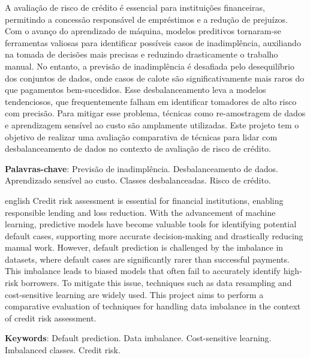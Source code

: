 
\setlength{\absparsep}{18pt} %
\begin{resumo}
  A avaliação de risco de crédito é essencial para instituições financeiras,
  permitindo a concessão responsável de empréstimos e a redução de
  prejuízos. Com
  o avanço do aprendizado de máquina, modelos preditivos tornaram-se
  ferramentas valiosas para identificar possíveis casos de
  inadimplência, auxiliando
  na tomada de decisões mais precisas e reduzindo drasticamente o
  trabalho manual.
  No entanto, a previsão de inadimplência é desafiada pelo
  desequilíbrio dos conjuntos
  de dados, onde casos de calote são significativamente mais raros do que
  pagamentos bem-sucedidos. Esse desbalanceamento leva a modelos tendenciosos,
  que frequentemente falham em identificar tomadores de alto risco com
  precisão. Para mitigar esse problema, técnicas como re-amostragem de dados e
  aprendizagem sensível ao custo são amplamente utilizadas. Este projeto tem o
  objetivo de realizar uma avaliação comparativa de técnicas para
  lidar com desbalanceamento
  de dados no contexto de avaliação de risco de crédito.

  \textbf{Palavras-chave}: Previsão de inadimplência. Desbalanceamento de
  dados. Aprendizado sensível ao custo. Classes desbalanceadas. Risco
  de crédito.
\end{resumo}

\begin{resumo}
  [Abstract]
  \begin{otherlanguage*}
    {english} Credit risk assessment is essential for financial institutions,
    enabling responsible lending and loss reduction. With the advancement of
    machine learning, predictive models have become valuable tools for
    identifying potential default cases, supporting more accurate
    decision-making
    and drastically reducing manual work. However, default prediction
    is challenged
    by the imbalance in datasets, where default cases are significantly
    rarer than successful payments. This imbalance leads to biased models that
    often fail to accurately identify high-risk borrowers. To mitigate this
    issue, techniques such as data resampling and cost-sensitive learning are
    widely used. This project aims to perform a comparative evaluation of
    techniques for handling data imbalance in the context of credit risk
    assessment.

    \vspace{\onelineskip}

    \noindent
    \textbf{Keywords}: Default prediction. Data imbalance.
    Cost-sensitive learning.
    Imbalanced classes. Credit risk.
  \end{otherlanguage*}
\end{resumo}
